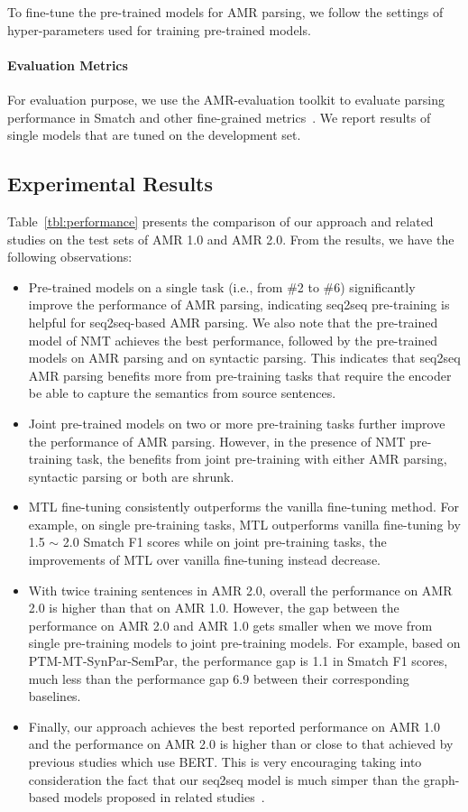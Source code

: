 \documentclass[11pt,a4paper]{article}
\begin{document}
To fine-tune the pre-trained models for AMR parsing, we follow the settings of hyper-parameters used for training pre-trained models.

\paragraph{Evaluation Metrics}
For evaluation purpose, we use the AMR-evaluation toolkit to evaluate parsing performance in Smatch and other fine-grained metrics~\cite{cai_knight_eacl_2013,damonte_etal_eacl_2017}. We report results of single models that are tuned on the development set.

\subsection{Experimental Results}
Table~\ref{tbl:performance} presents the comparison of our approach and related studies on the test sets of AMR 1.0 and AMR 2.0. From the results, we have the following observations:

\begin{itemize}\item Pre-trained models on a single task (i.e., from \#2 to \#6) significantly improve the performance of AMR parsing, indicating seq2seq pre-training is helpful for seq2seq-based AMR parsing. We also note that the pre-trained model of NMT achieves the best performance, followed by the pre-trained models on AMR parsing and on syntactic parsing. This indicates that seq2seq AMR parsing benefits more from pre-training tasks that require the encoder be able to capture the semantics from source sentences. 
    \item Joint pre-trained models on two or more pre-training tasks further improve the performance of AMR parsing. However, in the presence of NMT pre-training task, the benefits from joint pre-training with either AMR parsing, syntactic parsing or both are shrunk. 
    \item MTL fine-tuning consistently outperforms the vanilla fine-tuning method. For example, on single pre-training tasks, MTL outperforms vanilla fine-tuning by 1.5 $\sim$ 2.0 Smatch F1 scores while on joint pre-training tasks, the improvements of MTL over vanilla fine-tuning instead decrease.
    \item With twice training sentences in AMR 2.0, overall the performance on AMR 2.0 is higher than that on AMR 1.0. However, the gap between the performance on AMR 2.0 and AMR 1.0 gets smaller when we move from single pre-training models to joint pre-training models. For example, based on PTM-MT-SynPar-SemPar, the performance gap is 1.1 in Smatch F1 scores, much less than the performance gap 6.9 between their corresponding baselines.
    \item Finally, our approach achieves the best reported performance on AMR 1.0 and the performance on AMR 2.0 is higher than or close to that achieved by previous studies which use BERT. This is very encouraging taking into consideration the fact that our seq2seq model is much simper than the graph-based models proposed in related studies~\cite{zhang_etal_acl_2019,zhang_etal_emnlp_2019,naseem_etal_acl_2019, cai_lam_acl_2020}.
\end{itemize}
\end{document}
